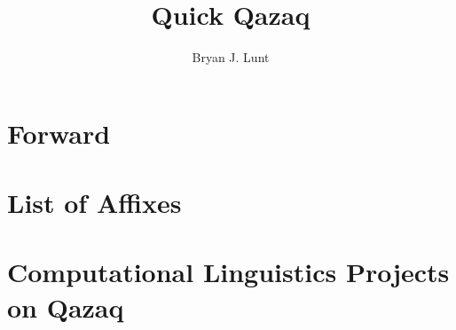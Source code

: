 \documentclass[12pt]{qqbook}
\title{Quick Qazaq}
\author{Bryan J. Lunt}
\date{} %
\begin{document}
\frontmatter
\maketitle

\chapter*{Forward}
\lipsum[1]

\tableofcontents

\mainmatter

\appendix %
\chapter{List of Affixes}
\lipsum[1]

\chapter{Computational Linguistics Projects on Qazaq}
\lipsum[2]

\backmatter
\lipsum[1]
\end{document}
